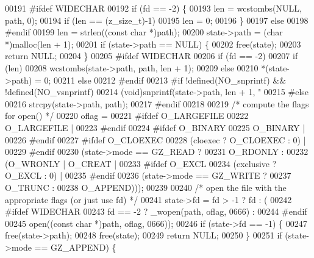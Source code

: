 \begin{DoxyCode}
{00191 \textcolor{preprocessor}{#ifdef WIDECHAR}
00192     \textcolor{keywordflow}{if} (fd == -2) \{
00193         len = wcstombs(NULL, path, 0);
00194         \textcolor{keywordflow}{if} (len == (z\_size\_t)-1)
00195             len = 0;
00196     \}
00197     \textcolor{keywordflow}{else}
00198 \textcolor{preprocessor}{#endif}
00199         len = strlen((\textcolor{keyword}{const} \textcolor{keywordtype}{char} *)path);
00200     state->path = (\textcolor{keywordtype}{char} *)malloc(len + 1);
00201     \textcolor{keywordflow}{if} (state->path == NULL) \{
00202         free(state);
00203         \textcolor{keywordflow}{return} NULL;
00204     \}
00205 \textcolor{preprocessor}{#ifdef WIDECHAR}
00206     \textcolor{keywordflow}{if} (fd == -2)
00207         \textcolor{keywordflow}{if} (len)
00208             wcstombs(state->path, path, len + 1);
00209         \textcolor{keywordflow}{else}
00210             *(state->path) = 0;
00211     \textcolor{keywordflow}{else}
00212 \textcolor{preprocessor}{#endif}
00213 \textcolor{preprocessor}{#if !defined(NO\_snprintf) && !defined(NO\_vsnprintf)}
00214         (void)snprintf(state->path, len + 1, \textcolor{stringliteral}{"%
00215 \textcolor{preprocessor}{#else}
00216         strcpy(state->path, path);
00217 \textcolor{preprocessor}{#endif}
00218 
00219     \textcolor{comment}{/* compute the flags for open() */}
00220     oflag =
00221 \textcolor{preprocessor}{#ifdef O\_LARGEFILE}
00222         O\_LARGEFILE |
00223 \textcolor{preprocessor}{#endif}
00224 \textcolor{preprocessor}{#ifdef O\_BINARY}
00225         O\_BINARY |
00226 \textcolor{preprocessor}{#endif}
00227 \textcolor{preprocessor}{#ifdef O\_CLOEXEC}
00228         (cloexec ? O\_CLOEXEC : 0) |
00229 #endif
00230         (state->mode == GZ\_READ ?
00231          O\_RDONLY :
00232          (O\_WRONLY | O\_CREAT |
00233 #ifdef O\_EXCL
00234           (exclusive ? O\_EXCL : 0) |
00235 #endif
00236           (state->mode == GZ\_WRITE ?
00237            O\_TRUNC :
00238            O\_APPEND)));
00239 
00240     \textcolor{comment}{/* open the file with the appropriate flags (or just use fd) */}
00241     state->fd = fd > -1 ? fd : (
00242 \textcolor{preprocessor}{#ifdef WIDECHAR}
00243         fd == -2 ? \_wopen(path, oflag, 0666) :
00244 #endif
00245         open((const char *)path, oflag, 0666));
00246     \textcolor{keywordflow}{if} (state->fd == -1) \{
00247         free(state->path);
00248         free(state);
00249         \textcolor{keywordflow}{return} NULL;
00250     \}
00251     \textcolor{keywordflow}{if} (state->mode == GZ\_APPEND) \{
}}
\end{DoxyCode}
